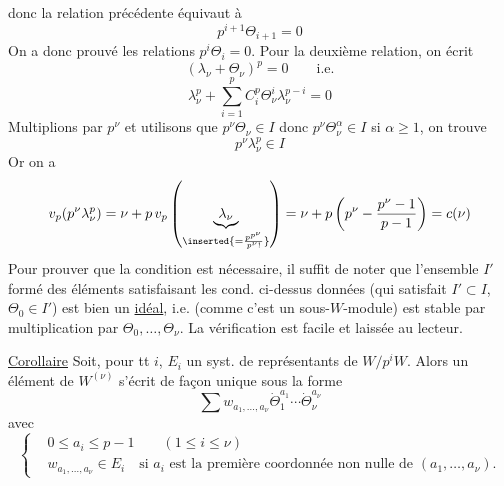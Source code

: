 donc la relation précédente équivaut à
\[
p^{i+1}\Theta_{i+1}=0
\]
On a donc prouvé les relations $p^i\Theta_i=0$. Pour la deuxième relation, on écrit
\[
(\lambda_\nu+\Theta_\nu)^p=0\qquad\text{i.e.}
\]
\[
\lambda_\nu^p+\sum_{i=1}^p C_i^p\Theta_\nu^i\lambda_\nu^{p-i}=0
\]
Multiplions par $p^\nu$ et utilisons que $p^\nu\Theta_\nu\in I$ donc $p^\nu\Theta_\nu^\alpha\in I$ si $\alpha\geq1$, on trouve
\[
p^\nu\lambda_\nu^p\in I
\]
Or on a
\[
v_p(p^\nu\lambda_\nu^p)=\nu+p\,v_p\left(\underbrace{\lambda_\nu}_{\inserted{=\frac{p^{p^\nu}}{p^\nu!}}}\right)=\nu+p\left(p^\nu-\frac{p^\nu-1}{p-1}\right)=c(\nu)
\]
Pour prouver que la condition est nécessaire, il suffit de noter que l'ensemble $I'$ formé des éléments satisfaisant les cond.  ci-dessus données (qui satisfait $I'\subset I$, $\Theta_0\in I'$) est bien un \uline{idéal}, i.e.  (comme c'est un sous-$W$-module) est stable par multiplication par $\Theta_0,\ldots,\Theta_\nu$. La vérification est facile et laissée au lecteur.

\margin{!}

\uline{Corollaire} Soit, pour tt $i$, $E_i$ un syst. de représentants de $W/p^iW$. Alors un élément de $W^{(\nu)}$ s'écrit de façon unique sous la forme
\[
\sum w_{a_1,\ldots,a_\nu}\dot{\Theta}_1^{a_1}\cdots\dot{\Theta}_\nu^{a_\nu}
\]
avec
\[
\left\{\begin{aligned}
&0\leq a_i\leq p-1\qquad(1\leq i\leq\nu)\\
&w_{a_1,\ldots,a_\nu}\in E_i\quad\text{si }a_i\text{ est la première coordonnée non nulle de }(a_1,\ldots,a_\nu).
\end{aligned}\right.
\]

